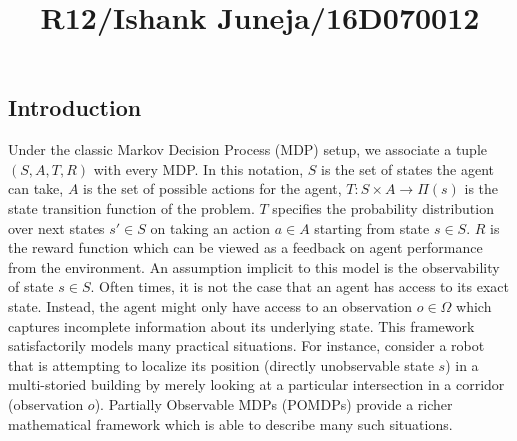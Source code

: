 \documentclass{article}
\title{R12/Ishank Juneja/16D070012}
\begin{document}
\maketitle
\thispagestyle{empty}

\subsection{Introduction}
Under the classic Markov Decision Process (MDP) setup, we associate a tuple $(S, A, T, R)$ with every MDP. In this notation, $S$ is the set of states the agent can take, $A$ is the set of possible actions for the agent, $T:S \times A \rightarrow \Pi(s)$ is the state transition function of the problem. $T$ specifies the probability distribution over next states $s' \in S$ on taking an action $a \in A$ starting from state $s \in S$. $R$ is the reward function which can be viewed as a feedback on agent performance from the environment. An assumption implicit to this model is the observability of state $s \in S$. Often times, it is not the case that an agent has access to its exact state. Instead, the agent might only have access to an observation $o \in \Omega$ which captures incomplete information about its underlying state. This framework satisfactorily models many practical situations. For instance, consider a robot that is attempting to localize its position (directly unobservable state $s$) in a multi-storied building by merely looking at a particular intersection in a corridor (observation $o$). Partially Observable MDPs (POMDPs) provide a richer mathematical framework which is able to describe many such situations.
\end{document}

